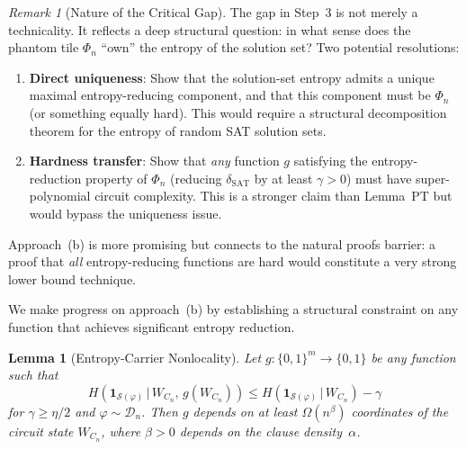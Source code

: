 \documentclass[11pt]{article}
\newtheorem{lemma}[theorem]{Lemma}
\theoremstyle{definition}
\theoremstyle{remark}
\newtheorem{remark}[theorem]{Remark}
\newcommand{\calD}{\mathcal{D}}
\newcommand{\calS}{\mathcal{S}}
\newcommand{\dSAT}{\delta_{\mathrm{SAT}}}
\begin{document}
\begin{remark}[Nature of the Critical Gap]
The gap in Step~3 is not merely a technicality.  It reflects a deep structural
question: in what sense does the phantom tile $\Phi_n$ ``own'' the entropy of
the solution set?  Two potential resolutions:

\begin{enumerate}[label=(\alph*)]
  \item \textbf{Direct uniqueness}: Show that the solution-set entropy admits
    a unique maximal entropy-reducing component, and that this component must
    be $\Phi_n$ (or something equally hard).  This would require a structural
    decomposition theorem for the entropy of random SAT solution sets.

  \item \textbf{Hardness transfer}: Show that \emph{any} function $g$ satisfying
    the entropy-reduction property of $\Phi_n$ (reducing $\dSAT$ by at least
    $\gamma > 0$) must have super-polynomial circuit complexity.  This is a
    stronger claim than Lemma~PT but would bypass the uniqueness issue.
\end{enumerate}

Approach~(b) is more promising but connects to the natural proofs barrier:
a proof that \emph{all} entropy-reducing functions are hard would constitute
a very strong lower bound technique.
\end{remark}

We make progress on approach~(b) by establishing a structural constraint
on any function that achieves significant entropy reduction.

\begin{lemma}[Entropy-Carrier Nonlocality]
\label{lem:entropy-nonlocal}
Let $g: \{0,1\}^m \to \{0,1\}$ be any function such that
\[
  H\!\left(\mathbf{1}_{\calS(\varphi)} \,\big|\, W_{C_n},\, g(W_{C_n})\right)
  \leq H\!\left(\mathbf{1}_{\calS(\varphi)} \,\big|\, W_{C_n}\right) - \gamma
\]
for $\gamma \geq \eta/2$ and $\varphi \sim \calD_n$.  Then $g$ depends on
at least $\Omega(n^\beta)$ coordinates of the circuit state $W_{C_n}$,
where $\beta > 0$ depends on the clause density~$\alpha$.
\end{lemma}
\end{document}
